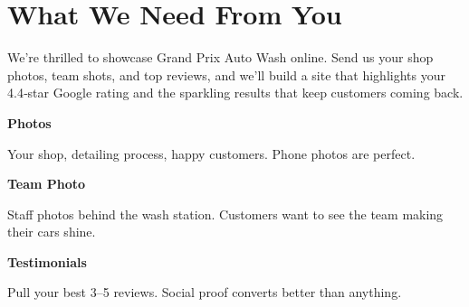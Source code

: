 \documentclass[11pt,letterpaper]{article}
\begin{document}
\vspace{0.2em}

\section*{What We Need From You}

We’re thrilled to showcase Grand Prix Auto Wash online. Send us your shop photos, team shots, and top reviews, and we’ll build a site that highlights your 4.4‑star Google rating and the sparkling results that keep customers coming back.

\vspace{0.12em}

\noindent\begin{minipage}[t]{0.48\textwidth}
\begin{tcolorbox}[colframe=accent-teal, boxrule=1pt, left=0.7em, right=0.7em, top=0.5em, bottom=0.5em, arc=4pt, boxsep=0pt]
{\bfseries\small\color{accent-teal}Photos}

\vspace{0.15em}

{\small Your shop, detailing process, happy customers. Phone photos are perfect.}
\end{tcolorbox}

\vspace{0.1em}

\begin{tcolorbox}[colframe=accent-teal, boxrule=1pt, left=0.7em, right=0.7em, top=0.5em, bottom=0.5em, arc=4pt, boxsep=0pt]
{\bfseries\small\color{accent-teal}Team Photo}

\vspace{0.15em}

{\small Staff photos behind the wash station. Customers want to see the team making their cars shine.}
\end{tcolorbox}

\vspace{0.1em}

\begin{tcolorbox}[colframe=accent-teal, boxrule=1pt, left=0.7em, right=0.7em, top=0.5em, bottom=0.5em, arc=4pt, boxsep=0pt]
{\bfseries\small\color{accent-teal}Testimonials}

\vspace{0.15em}

{\small Pull your best 3--5 reviews. Social proof converts better than anything.}
\end{tcolorbox}
\end{minipage}
\hfill
\end{document}
